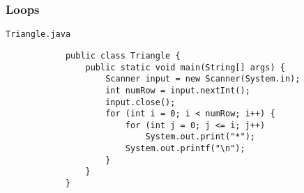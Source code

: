 \documentclass[10pt, compress]{beamer}
\begin{document}
\begin{frame}[fragile]
	\frametitle{Loops}
	\begin{block}{\texttt{Triangle.java}}
		\begin{verbatim}
			public class Triangle {
			    public static void main(String[] args) {
			        Scanner input = new Scanner(System.in);
			        int numRow = input.nextInt();
			        input.close();
			        for (int i = 0; i < numRow; i++) {
			            for (int j = 0; j <= i; j++)
			                System.out.print("*");
			            System.out.printf("\n");
			        }
			    }
			}
		\end{verbatim}
	\end{block}
\end{frame}

\end{document}
